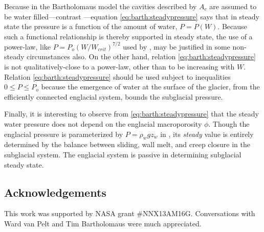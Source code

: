 \documentclass[twocolumn,letterpaper]{igs}
\begin{document}
Because in the Bartholomaus model the cavities described by $A_c$ are assumed to be water filled---contrast \citep{Schoofetal2012}---equation \eqref{eq:barth:steadypressure} says that in steady state the pressure is a function of the amount of water, $P=P(W)$.  Because such a functional relationship is thereby supported in steady state, the use of a power-law, like $P = P_o (W/W_{crit})^{7/2}$ used by \cite{FlowersClarke2002_theory}, may be justified in some non-steady circumstances also.  On the other hand, relation \eqref{eq:barth:steadypressure} is not qualitatively-close to a power-law, other than to be increasing with $W$.  Relation \eqref{eq:barth:steadypressure} should be used subject to inequalities $0 \le P \le P_o$ because the emergence of water at the surface of the glacier, from the efficiently connected englacial system, bounds the subglacial pressure.

Finally, it is interesting to observe from \eqref{eq:barth:steadypressure} that the steady water pressure does not depend on the englacial macroporosity $\phi$.  Though the englacial pressure is parameterized by $P=\rho_w g z_w$ in \cite{Bartholomausetal2011}, its \emph{steady} value is entirely determined by the balance between sliding, wall melt, and creep closure in the subglacial system.  The englacial system is passive in determining subglacial steady state.


\subsection*{Acknowledgements}  This work was supported by NASA grant \#NNX13AM16G.  Conversations with Ward van Pelt and Tim Bartholomaus were much appreciated.



\end{document}
